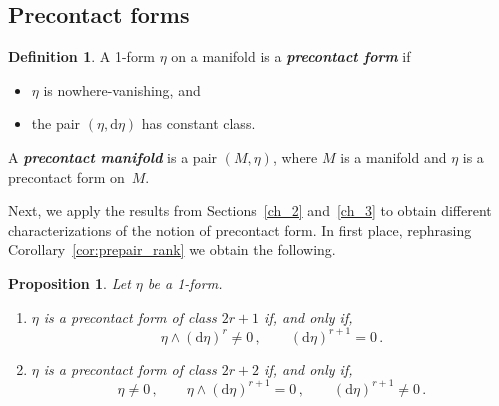 \documentclass[11pt,twoside]{article}
\theoremstyle{plain}
\newtheorem{proposition}[theorem]{Proposition}
\theoremstyle{definition}
\newtheorem{definition}[theorem]{Definition}
\renewcommand{\d}{\mathrm{d}}
\def\d{\mathrm{d}}
\newcommand\dfn[1]{{\textbf{\emph{#1}}}}
\def\d{\mathrm{d}}
\begin{document}
\subsection{Precontact forms}
\label{precontact_structures}


\begin{definition}%
A 1-form $\eta$ on a manifold is a \dfn{precontact form} if
\begin{itemize}
    \item 
    $\eta$ is nowhere-vanishing, and
    \item 
    the pair $(\eta, \d \eta)$ has constant class.
\end{itemize}
A \dfn{precontact manifold} is a pair $(M,\eta)$,
where $M$ is a manifold and $\eta$ is a precontact form on~$M$.
\end{definition}


Next, we apply the results from Sections~\ref{ch_2} and~\ref{ch_3} 
to obtain different characterizations of the notion of precontact form. In first place, rephrasing Corollary~\ref{cor:prepair_rank} we obtain the following.

\begin{proposition}
Let $\eta$ be a 1-form.
\begin{enumerate}[$(i)$]
\item 
$\eta$ is a precontact form of class $2r+1$ if, and only if, 
$$ 
            \eta\wedge(\d\eta)^{r} \neq 0\,,
            \qquad
            (\d\eta)^{r+1} = 0\,.
$$
\item 
$\eta$ is a precontact form of class $2r+2$ if, and only if,
$$  
            \eta \neq 0\,, \qquad \eta\wedge(\d\eta)^{r+1} = 0\,,
            \qquad
            (\d\eta)^{r+1} \neq 0\,.
    $$
\end{enumerate}
\end{proposition}


\end{document}
